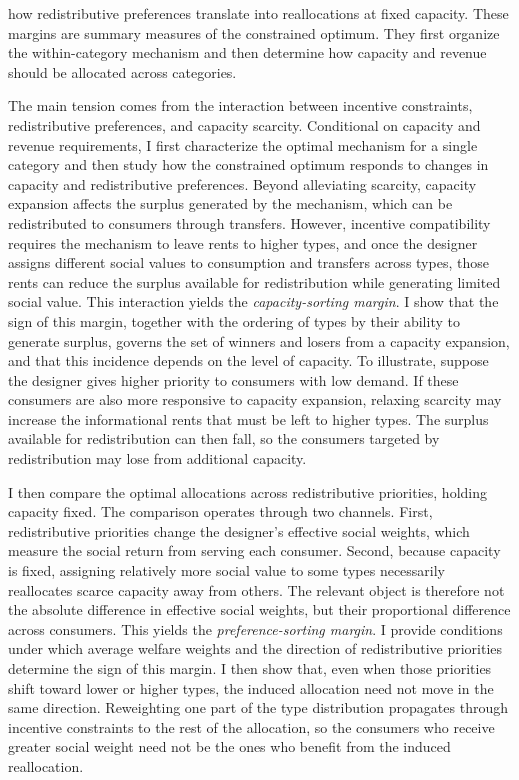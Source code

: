 \documentclass{class}
\begin{document}
how redistributive preferences translate into reallocations at fixed capacity. These margins are summary measures of the constrained optimum. They first organize the within-category mechanism and then determine how capacity and revenue should be allocated across categories.

The main tension comes from the interaction between incentive constraints, redistributive preferences, and capacity scarcity. Conditional on capacity and revenue requirements, I first characterize the optimal mechanism for a single category and then study how the constrained optimum responds to changes in capacity and redistributive preferences. Beyond alleviating scarcity, capacity expansion affects the surplus generated by the mechanism, which can be redistributed to consumers through transfers. However, incentive compatibility requires the mechanism to leave rents to higher types, and once the designer assigns different social values to consumption and transfers across types, those rents can reduce the surplus available for redistribution while generating limited social value. This interaction yields the \textit{capacity-sorting margin}. I show that the sign of this margin, together with the ordering of types by their ability to generate surplus, governs the set of winners and losers from a capacity expansion, and that this incidence depends on the level of capacity. To illustrate, suppose the designer gives higher priority to consumers with low demand. If these consumers are also more responsive to capacity expansion, relaxing scarcity may increase the informational rents that must be left to higher types. The surplus available for redistribution can then fall, so the consumers targeted by redistribution may lose from additional capacity.

I then compare the optimal allocations across redistributive priorities, holding capacity fixed. The comparison operates through two channels. First, redistributive priorities change the designer's effective social weights, which measure the social return from serving each consumer. Second, because capacity is fixed, assigning relatively more social value to some types necessarily reallocates scarce capacity away from others. The relevant object is therefore not the absolute difference in effective social weights, but their proportional difference across consumers. This yields the \textit{preference-sorting margin}. I provide conditions under which average welfare weights and the direction of redistributive priorities determine the sign of this margin. I then show that, even when those priorities shift toward lower or higher types, the induced allocation need not move in the same direction. Reweighting one part of the type distribution propagates through incentive constraints to the rest of the allocation, so the consumers who receive greater social weight need not be the ones who benefit from the induced reallocation.
\end{document}
